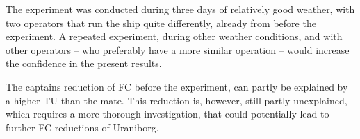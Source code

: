 The experiment was conducted during three days of relatively good weather, with two operators that run the ship quite differently, already from before the experiment.
A repeated experiment, during other weather conditions, and with other operators --   who preferably have a more similar operation -- would increase the confidence in the present results.

The captains reduction of FC before the experiment, can partly be explained by a higher TU  than the mate. %
This reduction is, however, still partly unexplained, which requires a more thorough investigation, that could potentially lead to further FC reductions of Uraniborg.